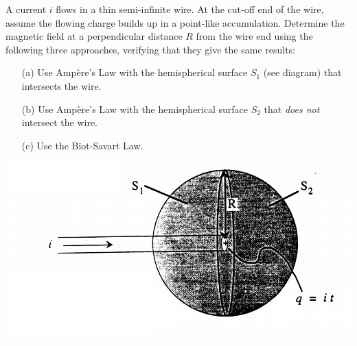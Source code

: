 \documentclass[12pt,letterpaper,boxed,cm]{hmcpset}
\begin{document}
\begin{problem}[SUP22]
A current $i$ flows in a thin semi-infinite wire. At the cut-off end of the wire, assume the flowing charge builds up in a point-like accumulation. Determine the magnetic field at a perpendicular distance $R$ from the wire end using the following three approaches, verifying that they give the same results:
\begin{enumerate}
	\item[(a)] Use Ampère's Law with the hemispherical surface $S_1$ (see diagram) that intersects the wire.
	\item[(b)] Use Ampère's Law with the hemispherical surface $S_2$ that \textit{does not} intersect the wire.
	\item[(c)] Use the Biot-Savart Law.
\end{enumerate}
\begin{center}
	\includegraphics[scale=0.5]{pic01.png}	
\end{center}
\end{problem}
\begin{solution}
\end{solution}
\end{document}
